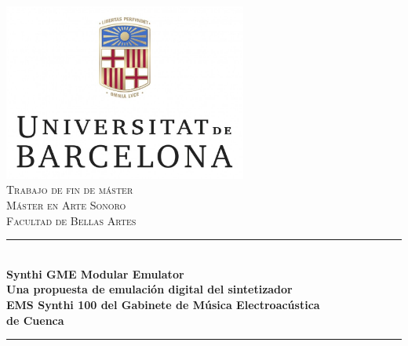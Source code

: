 \begin{titlepage}

\newcommand{\HRule}{\rule{\linewidth}{0.5mm}} %

\center %


\includegraphics[width=0.6\textwidth]{./portada/logoUB}\\[1cm] %
 

\textsc{\LARGE Trabajo de fin de máster}\\[1cm] %
\textsc{\Large Máster en Arte Sonoro}\\[0.5cm] %
\textsc{\large Facultad de Bellas Artes}\\[0.0cm] %


\HRule \\[0.0cm]
{ \Large \bfseries Synthi GME Modular Emulator\\ \vspace{0.4cm} \normalsize Una propuesta de emulación digital del sintetizador\\ EMS Synthi 100 del Gabinete de Música Electroacústica\\de Cuenca}\\[0.4cm] %
\HRule \\[0.3cm]
 

\end{titlepage}

